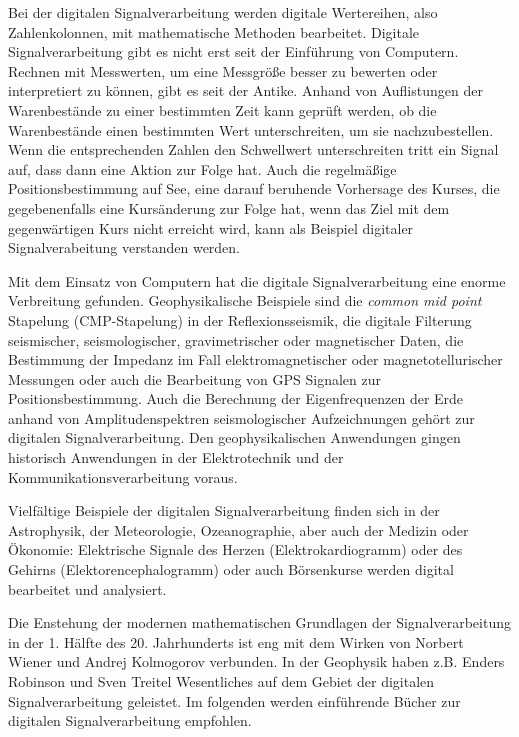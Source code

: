 Bei der digitalen Signalverarbeitung werden digitale Wertereihen, also Zahlenkolonnen, mit mathematische Methoden bearbeitet. Digitale Signalverarbeitung gibt es nicht erst seit der Einführung von Computern. Rechnen mit Messwerten, um eine Messgröße besser zu bewerten oder interpretiert zu können, gibt es seit der Antike. Anhand von Auflistungen der Warenbestände zu einer bestimmten Zeit kann geprüft werden, ob die Warenbestände einen bestimmten Wert unterschreiten, um sie nachzubestellen. Wenn die entsprechenden Zahlen den Schwellwert unterschreiten tritt ein Signal auf, dass dann eine Aktion zur Folge hat. Auch die regelmäßige Positionsbestimmung auf See, eine darauf beruhende Vorhersage des Kurses, die gegebenenfalls eine Kursänderung zur Folge hat, wenn das Ziel mit dem gegenwärtigen Kurs nicht erreicht wird, kann als Beispiel digitaler Signalverabeitung verstanden werden. 

Mit dem Einsatz von Computern hat die digitale Signalverarbeitung eine enorme Verbreitung gefunden. Geophysikalische Beispiele sind die \textit{common mid point} Stapelung (CMP-Stapelung) in der Reflexionsseismik, die digitale Filterung seismischer, seismologischer, gravimetrischer oder magnetischer Daten, die Bestimmung der Impedanz im Fall elektromagnetischer oder magnetotellurischer Messungen oder auch die Bearbeitung von GPS Signalen zur Positionsbestimmung. Auch die Berechnung der Eigenfrequenzen der Erde anhand von Amplitudenspektren seismologischer Aufzeichnungen gehört zur digitalen Signalverarbeitung. Den geophysikalischen Anwendungen gingen historisch Anwendungen in der Elektrotechnik und der Kommunikationsverarbeitung voraus. 

Vielfältige Beispiele der digitalen Signalverarbeitung finden sich in der Astrophysik, der Meteorologie, Ozeanographie, aber auch der Medizin oder Ökonomie: Elektrische Signale des Herzen (Elektrokardiogramm) oder des Gehirns (Elektorencephalogramm) oder auch Börsenkurse werden digital bearbeitet und analysiert.

Die Enstehung der modernen mathematischen Grundlagen der Signalverarbeitung in der 1. Hälfte des 20. Jahrhunderts ist eng mit dem Wirken von Norbert Wiener und Andrej Kolmogorov verbunden. In der Geophysik haben z.B. Enders Robinson und Sven Treitel Wesentliches auf dem Gebiet der digitalen Signalverarbeitung geleistet. Im folgenden werden einführende Bücher zur digitalen Signalverarbeitung empfohlen.

\vspace{0.3cm}

